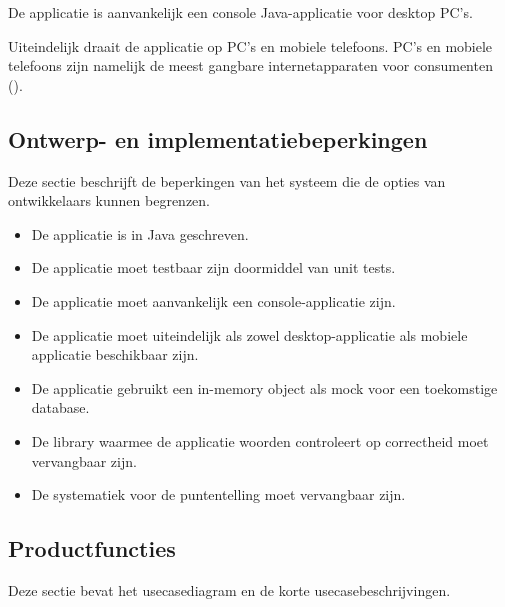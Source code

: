 De applicatie is aanvankelijk een console Java-applicatie voor desktop PC's.

Uiteindelijk draait de applicatie op PC's en mobiele telefoons. PC's en mobiele telefoons zijn namelijk de meest gangbare internetapparaten voor consumenten (\cite{globalstats}).

\subsection{Ontwerp- en implementatiebeperkingen}
Deze sectie beschrijft de beperkingen van het systeem die de opties van ontwikkelaars kunnen begrenzen.
\begin{itemize}
   \item De applicatie is in Java geschreven.
   \item De applicatie moet testbaar zijn doormiddel van unit tests.
   \item De applicatie moet aanvankelijk een console-applicatie zijn.
   \item De applicatie moet uiteindelijk als zowel desktop-applicatie als mobiele applicatie beschikbaar zijn.
   \item De applicatie gebruikt een in-memory object als mock voor een toekomstige database.
   \item De library waarmee de applicatie woorden controleert op correctheid moet vervangbaar zijn.
   \item De systematiek voor de puntentelling moet vervangbaar zijn.
\end{itemize}

\subsection{Productfuncties}
Deze sectie bevat het usecasediagram en de korte usecasebeschrijvingen.

